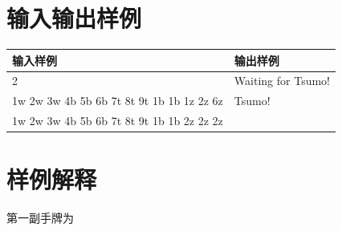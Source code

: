 \documentclass[
	lang=cn,
	color=green
]{elegantbook}
\begin{document}
\section*{输入输出样例}
\begin{tabularx}{450pt}{X|X}
    \toprule
    输入样例                                  & 输出样例           \\
    \midrule
    2                                         & Waiting for Tsumo! \\
    1w 2w 3w 4b 5b 6b 7t 8t 9t 1b 1b 1z 2z 6z & Tsumo!             \\
    1w 2w 3w 4b 5b 6b 7t 8t 9t 1b 1b 2z 2z 2z &                    \\
    \bottomrule
\end{tabularx}

\section*{样例解释}

第一副手牌为
\end{document}
